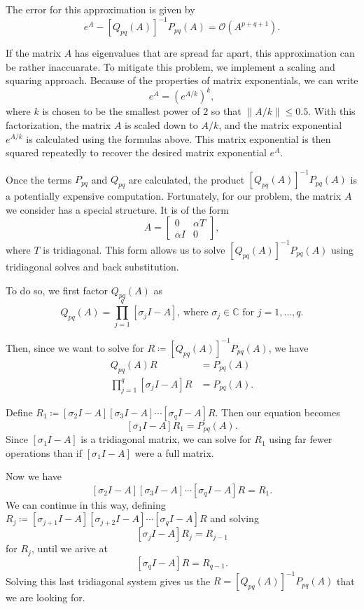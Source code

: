 \documentclass{csri19}
\begin{document}
The error for this approximation is given by
\[ e^A - \left[Q_{pq}(A)\right]^{-1}P_{pq}(A) = \mathcal{O}(A^{p+q+1}).\]

If the matrix $A$ has eigenvalues that are spread far apart, this 
approximation can be rather inaccuarate. To mitigate this problem, we 
implement a scaling and squaring approach. Because of the properties of 
matrix exponentials, we can write
\[e^{A} = \left(e^{A/k}\right)^k,\]
where $k$ is chosen to be the smallest power of $2$ so that 
$\|A/k\| \leq 0.5$. With this factorization, the matrix $A$ is scaled down
 to $A/k$, and the matrix exponential $e^{A/k}$ is calculated using the 
formulas above. This matrix exponential is then squared repeatedly to 
recover the desired matrix exponential $e^{A}$.

Once the terms $P_{pq}$ and $Q_{pq}$ are calculated, the product 
$\left[Q_{pq}(A)\right]^{-1}P_{pq}(A)$ is a potentially expensive 
computation. Fortunately, for our problem, the matrix $A$ we consider has a
 special structure. It is of the form 
\[A= \begin{bmatrix} 0 & \alpha T\\
  \alpha I & 0 \end{bmatrix},\]
where $T$ is tridiagonal. This form allows us to solve 
$\left[Q_{pq}(A)\right]^{-1}P_{pq}(A)$ using tridiagonal solves and back 
substitution.

To do so, we first factor $Q_{pq}(A)$ as
\[ Q_{pq}(A) = \prod_{j=1}^q\left[\sigma_jI-A\right]\text{, where }\sigma_j\in \mathbb{C}\text{ for }j=1,\dots,q.\]

Then, since we want to solve for 
$R \coloneqq \left[Q_{pq}(A)\right]^{-1}P_{pq}(A)$, we have
\begin{align*}
Q_{pq}(A) R &= P_{pq}(A)\\
\prod_{j=1}^q\left[\sigma_jI-A\right]R &= P_{pq}(A).
\end{align*}

Define $R_1 \coloneqq \left[\sigma_2I-A\right]\left[\sigma_3I-A\right]\cdots\left[\sigma_qI-A\right]R$.
Then our equation becomes
\[ \left[\sigma_1I-A\right]R_1 = P_{pq}(A).\] Since $\left[\sigma_1I-A\right]$ 
is a tridiagonal matrix, we can solve for $R_1$ using far fewer operations
 than if $\left[\sigma_1I-A\right]$ were a full matrix.

Now we have
\[\left[\sigma_2I-A\right]\left[\sigma_3I-A\right]\cdots\left[\sigma_qI-A\right]R = R_1.\] 
We can continue in this way, defining 
$R_j \coloneqq \left[\sigma_{j+1}I-A\right]\left[\sigma_{j+2}I-A\right]\cdots\left[\sigma_qI-A\right]R$
 and solving
\[\left[\sigma_jI-A\right]R_j = R_{j-1}\] 
for $R_j$, until we arive at
\[\left[\sigma_qI-A\right]R = R_{q-1}.\] 
Solving this last tridiagonal system gives us the $R = \left[Q_{pq}(A)\right]^{-1}P_{pq}(A)$
 that we are looking for.
\end{document}

